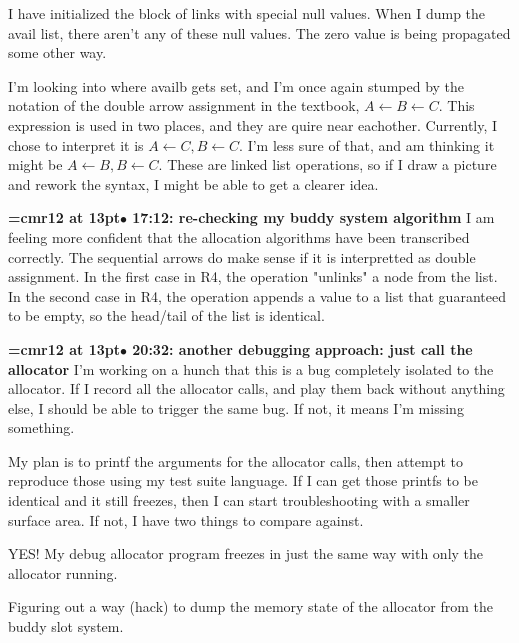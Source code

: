 I have initialized the block of links with special null values. When I dump the avail list, there aren't any of these null values. The zero value is being propagated some other way.
\par

I'm looking into where availb gets set, and I'm once again stumped by the notation of the double arrow assignment in the textbook, $A \gets B \gets C$. This expression is used in two places, and they are quire near eachother. Currently, I chose to interpret it is $A \gets C, B \gets C$. I'm less sure of that, and am thinking it might be $A \gets B, B \gets C$. These are linked list operations, so if I draw a picture and rework the syntax, I might be able to get a clearer idea.
\par

{\smallskip\noindent\bf\font\titlefont=cmr12 at 13pt\titlefont $\bullet$ 17:12: re-checking my buddy system algorithm}\smallskip
I am feeling more confident that the allocation algorithms have been transcribed correctly. The sequential arrows do make sense if it is interpretted as double assignment. In the first case in R4, the operation "unlinks" a node from the list. In the second case in R4, the operation appends a value to a list that guaranteed to be empty, so the head/tail of the list is identical.
\par

{\smallskip\noindent\bf\font\titlefont=cmr12 at 13pt\titlefont $\bullet$ 20:32: another debugging approach: just call the allocator}\smallskip
I'm working on a hunch that this is a bug completely isolated to the allocator. If I record all the allocator calls, and play them back without anything else, I should be able to trigger the same bug. If not, it means I'm missing something.
\par

My plan is to printf the arguments for the allocator calls, then attempt to reproduce those using my test suite language. If I can get those printfs to be identical and it still freezes, then I can start troubleshooting with a smaller surface area. If not, I have two things to compare against.
\par

YES! My debug allocator program freezes in just the same way with only the allocator running.
\par

Figuring out a way (hack) to dump the memory state of the allocator from the buddy slot system.
\par

